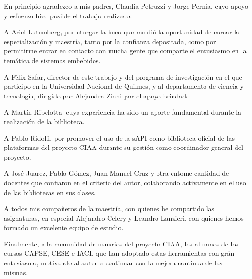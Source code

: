 En principio agradezco a mis padres, Claudia Petruzzi y Jorge Pernia, cuyo apoyo y esfuerzo hizo posible el trabajo realizado.

A Ariel Lutemberg, por otorgar la beca que me dió la oportunidad de cursar la especialización y maestría, tanto por la confianza depositada, como por permitirme entrar en contacto con mucha gente que comparte el entusiasmo en la temática de sistemas embebidos.

A Félix Safar, director de este trabajo y del programa de investigación en el que participo en la Universidad Nacional de Quilmes, y al departamento de ciencia y tecnología, dirigido por Alejandra Zinni por el apoyo brindado.

A Martín Ribelotta, cuya experiencia ha sido un aporte fundamental durante la realización de la biblioteca.

A Pablo Ridolfi, por promover el uso de la sAPI como biblioteca oficial de las plataformas del proyecto CIAA durante su gestión como coordinador general del proyecto.

A José Juarez, Pablo Gómez, Juan Manuel Cruz y otra entome cantidad de docentes que confiaron en el criterio del autor, colaborando activamente en el uso de las bibliotecas en sus clases.

A todos mis compañeros de la maestría, con quienes he compartido las asignaturas, en especial Alejandro Celery y Leandro Lanzieri, con quienes hemos formado un excelente equipo de estudio.

Finalmente, a la comunidad de usuarios del proyecto CIAA, los alumnos de los cursos CAPSE, CESE e IACI, que han adoptado estas herramientas con grán entusiasmo, motivando al autor a continuar con la mejora continua de las mismas.
